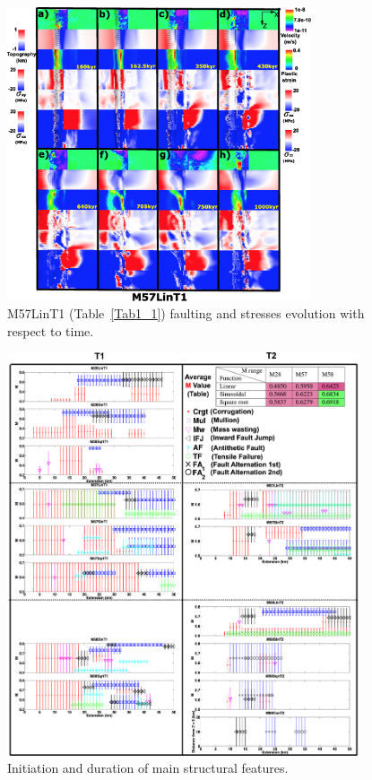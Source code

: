 \documentclass[draft,gc]{agutex}
\begin{document}
\begin{figure}[h]
\noindent\includegraphics[width=0.8\textwidth]{./Figures/fig_Results_MRange_2_M57LinT1_time_evolution.eps}
 \caption{M57LinT1 (Table~\ref{Tab1_1}) faulting and stresses evolution with respect to time.}
\label{fig_Results_MRange_2}
\end{figure}

\begin{figure}[h]
\noindent\includegraphics[width=0.926\textwidth]{./Figures/fig_Discussion_Result_Summary_1_Combine_together.eps}
    \caption{Initiation and duration of main structural features.}
 \label{fig_Discussion_Result_Summary_1_Combine_together}
\end{figure} 
\end{document}
